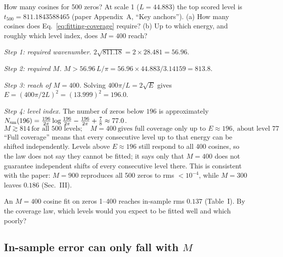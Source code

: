 \begin{sample}{How many cosines for 500 zeros?}
At scale 1 ($L=44.883$) the top scored level is $t_{500}=811.1843588465$ (paper Appendix~A, ``Key anchors''). (a) How many cosines does Eq.~\eqref{eq:fitting-coverage} require? (b) Up to which energy, and roughly which level index, does $M=400$ reach?

\emph{Step 1: required wavenumber.} $2\sqrt{811.18}=2\times28.481=56.96$.

\emph{Step 2: required $M$.} $M>56.96\,L/\pi=56.96\times44.883/3.14159=813.8$.

\emph{Step 3: reach of $M=400$.} Solving $400\pi/L=2\sqrt{E}$ gives $E=(400\pi/2L)^2=(13.999)^2=196.0$.

\emph{Step 4: level index.} The number of zeros below $196$ is approximately $N_{\mathrm{sm}}(196)=\frac{196}{2\pi}\log\frac{196}{2\pi}-\frac{196}{2\pi}+\frac78\approx77.0$.
\[
\boxed{M\gtrsim 814\ \text{for all 500 levels};\quad M=400\ \text{gives full coverage only up to }E\approx196,\ \text{about level }77}
\]
``Full coverage'' means that every consecutive level up to that energy can be shifted independently. Levels above $E\approx196$ still respond to all 400 cosines, so the law does not say they cannot be fitted; it says only that $M=400$ does not guarantee independent shifts of every consecutive level there.
This is consistent with the paper: $M=900$ reproduces all 500 zeros to rms $<10^{-4}$, while $M=300$ leaves $0.186$ (Sec.~III).
\end{sample}

\begin{checkpoint}
An $M=400$ cosine fit on zeros 1--400 reaches in-sample rms $0.137$ (Table~I). By the coverage law, which levels would you expect to be fitted well and which poorly?
\end{checkpoint}

\subsection{In-sample error can only fall with $M$}


